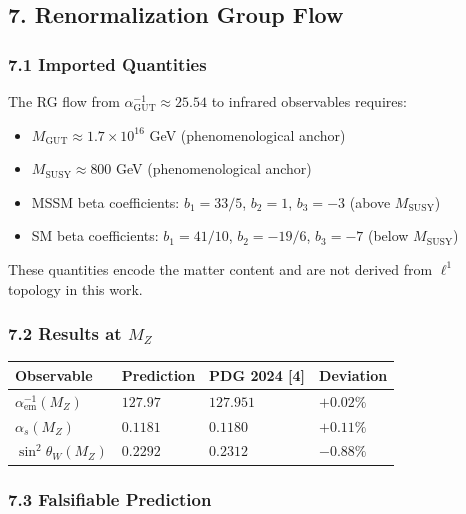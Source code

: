 \documentclass[
]{article}
\providecommand{\tightlist}{%
  \setlength{\itemsep}{0pt}\setlength{\parskip}{0pt}}
\begin{document}
\hypertarget{renormalization-group-flow}{%
\subsection{7. Renormalization Group
Flow}\label{renormalization-group-flow}}

\hypertarget{imported-quantities}{%
\subsubsection{7.1 Imported Quantities}\label{imported-quantities}}

The RG flow from \(\alpha_{\mathrm{GUT}}^{-1} \approx 25.54\) to
infrared observables requires:

\begin{itemize}
\tightlist
\item
  \(M_{\mathrm{GUT}} \approx 1.7 \times 10^{16}\) GeV (phenomenological
  anchor)
\item
  \(M_{\mathrm{SUSY}} \approx 800\) GeV (phenomenological anchor)
\item
  MSSM beta coefficients: \(b_1 = 33/5\), \(b_2 = 1\), \(b_3 = -3\)
  (above \(M_{\mathrm{SUSY}}\))
\item
  SM beta coefficients: \(b_1 = 41/10\), \(b_2 = -19/6\), \(b_3 = -7\)
  (below \(M_{\mathrm{SUSY}}\))
\end{itemize}

These quantities encode the matter content and are not derived from
\(\ell^1\) topology in this work.

\hypertarget{results-at-m_z}{%
\subsubsection{\texorpdfstring{7.2 Results at
\(M_Z\)}{7.2 Results at M\_Z}}\label{results-at-m_z}}

\begin{longtable}[]{@{}llll@{}}
\toprule
Observable & Prediction & PDG 2024 {[}4{]} & Deviation\tabularnewline
\midrule
\endhead
\(\alpha_{\mathrm{em}}^{-1}(M_Z)\) & \(127.97\) & \(127.951\) &
\(+0.02\%\)\tabularnewline
\(\alpha_s(M_Z)\) & \(0.1181\) & \(0.1180\) & \(+0.11\%\)\tabularnewline
\(\sin^2\theta_W(M_Z)\) & \(0.2292\) & \(0.2312\) &
\(-0.88\%\)\tabularnewline
\bottomrule
\end{longtable}

\hypertarget{falsifiable-prediction}{%
\subsubsection{7.3 Falsifiable
Prediction}\label{falsifiable-prediction}}
\end{document}
